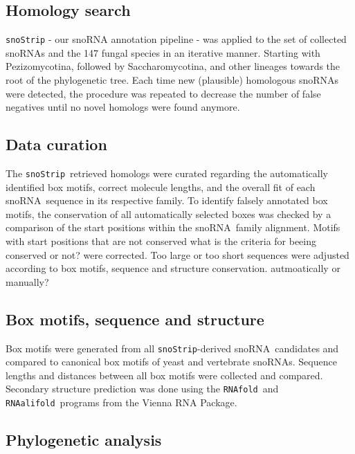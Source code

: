 \documentclass[preprint,3p,times,twocolumn]{elsarticle}
\newcommand{\JH}[1]{\begingroup\color{purple}#1\endgroup}
\newcommand{\sno}{snoRNA}
\newcommand{\snostrip}{\texttt{snoStrip}}
\newcommand{\fold}{\texttt{RNAfold}}
\newcommand{\alifold}{\texttt{RNAalifold}}
\begin{document}
\subsection{Homology search}

\snostrip\citep{Bartschat:2014} - our snoRNA annotation pipeline - was applied to the set of collected snoRNAs and the 147 fungal species in an iterative manner. Starting with Pezizomycotina, followed by Saccharomycotina, and other lineages towards the root of the phylogenetic tree. Each time new (plausible) homologous snoRNAs were detected, the procedure was repeated to decrease the number of false negatives until no novel homologs were found anymore.

\subsection{Data curation}

The \snostrip\ retrieved homologs were curated regarding the automatically identified box motifs, correct molecule lengths, and the overall fit of each \sno\ sequence in its respective family. 
To identify falsely annotated box motifs, the conservation
of all automatically selected  boxes was checked by a comparison
of the start positions within the \sno\ family alignment. Motifs with start positions that are not conserved \JH{what is the criteria for beeing conserved or not?} were corrected. 
Too large or too short sequences were adjusted according to box motifs, sequence and structure conservation. \JH{autmoatically or manually?} 

\subsection{Box motifs, sequence and structure}

Box motifs were generated from all \snostrip-derived \sno\ candidates and compared to canonical box motifs of yeast and vertebrate snoRNAs. 
Sequence lengths and distances between all box motifs were collected and compared. Secondary structure prediction was done using the \fold\ and \alifold\ programs from the Vienna RNA Package\cite{Hofacker:1994}. 

\subsection{Phylogenetic analysis}
\end{document}
